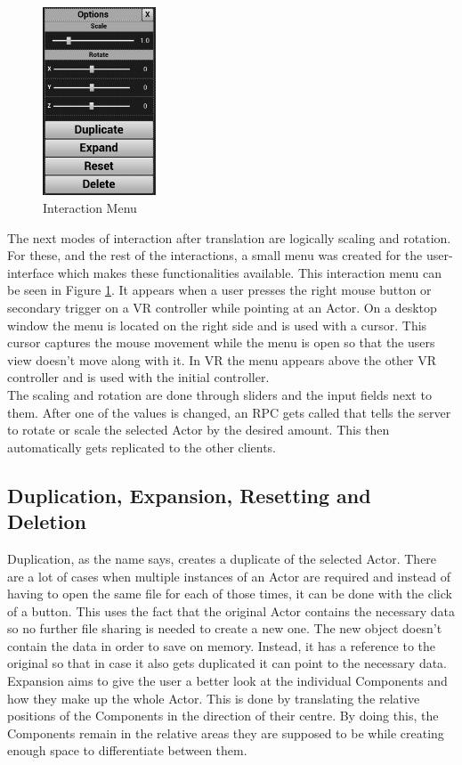 \begin{figure}
	\centering
	\includegraphics[width=0.30\textwidth]{fig/InteractionMenu2.png}
	\caption[Interaction Menu instead of UI Editor]{Interaction Menu}
	\label{fig:InteractionMenu}
\end{figure}

The next modes of interaction after translation are logically scaling and rotation. For these, and the rest of the interactions, a small menu was created for the user-interface which makes these functionalities available. This interaction menu can be seen in Figure \ref{fig:InteractionMenu}. It appears when a user presses the right mouse button or secondary trigger on a \acs{VR} controller while pointing at an Actor. On a desktop window the menu is located on the right side and is used with a cursor. This cursor captures the mouse movement while the menu is open so that the users view doesn't move along with it. In \acs{VR} the menu appears above the other VR controller and is used with the initial controller.\\
The scaling and rotation are done through sliders and the input fields next to them. After one of the values is changed, an \acs{RPC} gets called that tells the server to rotate or scale the selected Actor by the desired amount. This then automatically gets replicated to the other clients.

\subsection{Duplication, Expansion, Resetting and Deletion}

Duplication, as the name says, creates a duplicate of the selected Actor. There are a lot of cases when multiple instances of an Actor are required and instead of having to open the same file for each of those times, it can be done with the click of a button. This uses the fact that the original Actor contains the necessary data so no further file sharing is needed to create a new one. The new object doesn't contain the data in order to save on memory. Instead, it has a reference to the original so that in case it also gets duplicated it can point to the necessary data.\\
Expansion aims to give the user a better look at the individual Components and how they make up the whole Actor. This is done by translating the relative positions of the Components in the direction of their centre. By doing this, the Components remain in the relative areas they are supposed to be while creating enough space to differentiate between them.

